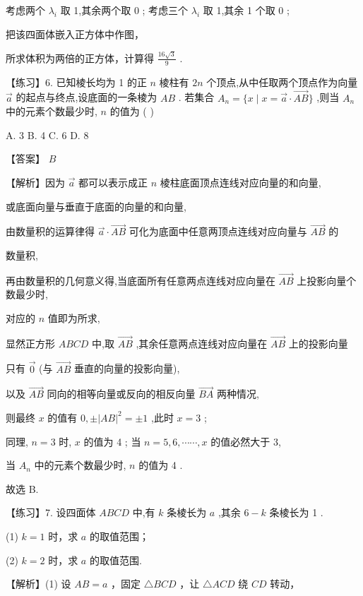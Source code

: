 \documentclass[10pt]{article}
\begin{document}
考虑两个 \({\lambda }_{i}\) 取 1,其余两个取 0 ; 考虑三个 \({\lambda }_{i}\) 取 1,其余 1 个取 0 ;

把该四面体嵌入正方体中作图，

所求体积为两倍的正方体，计算得 \(\frac{{16}\sqrt{3}}{9}\) .

【练习】6. 已知棱长均为 1 的正 \(n\) 棱柱有 \({2n}\) 个顶点,从中任取两个顶点作为向量 \(\overrightarrow{a}\) 的起点与终点,设底面的一条棱为 \({AB}\) . 若集合 \({A}_{n} = \{ x \mid  x = \overrightarrow{a} \cdot  \overrightarrow{AB}\}\) ,则当 \({A}_{n}\) 中的元素个数最少时, \(n\) 的值为 ( )

A. 3 B. 4 C. 6 D. 8

【答案】 \(B\)

【解析】因为 \(\overrightarrow{a}\) 都可以表示成正 \(n\) 棱柱底面顶点连线对应向量的和向量,

或底面向量与垂直于底面的向量的和向量,

由数量积的运算律得 \(\overrightarrow{a} \cdot  \overrightarrow{AB}\) 可化为底面中任意两顶点连线对应向量与 \(\overrightarrow{AB}\) 的

数量积,

再由数量积的几何意义得,当底面所有任意两点连线对应向量在 \(\overrightarrow{AB}\) 上投影向量个数最少时,

对应的 \(n\) 值即为所求,

显然正方形 \({ABCD}\) 中,取 \(\overrightarrow{AB}\) ,其余任意两点连线对应向量在 \(\overrightarrow{AB}\) 上的投影向量

只有 \(\overrightarrow{0}\) (与 \(\overrightarrow{AB}\) 垂直的向量的投影向量),

以及 \(\overrightarrow{AB}\) 同向的相等向量或反向的相反向量 \(\overrightarrow{BA}\) 两种情况,

则最终 \(x\) 的值有 \(0, \pm  {\left| AB\right| }^{2} =  \pm  1\) ,此时 \(x = 3\) ;

同理, \(n = 3\) 时, \(x\) 的值为 4 ; 当 \(n = 5,6,\cdots \cdots ,x\) 的值必然大于 3,

当 \({A}_{n}\) 中的元素个数最少时, \(n\) 的值为 4 .

故选 B.

【练习】7. 设四面体 \({ABCD}\) 中,有 \(k\) 条棱长为 \(a\) ,其余 \(6 - k\) 条棱长为 1 .

(1) \(k = 1\) 时，求 \(a\) 的取值范围；

(2) \(k = 2\) 时，求 \(a\) 的取值范围.

【解析】(1) 设 \({AB} = a\) ，固定 \(\bigtriangleup  {BCD}\) ，让 \(\bigtriangleup  {ACD}\) 绕 \({CD}\) 转动，
\end{document}
